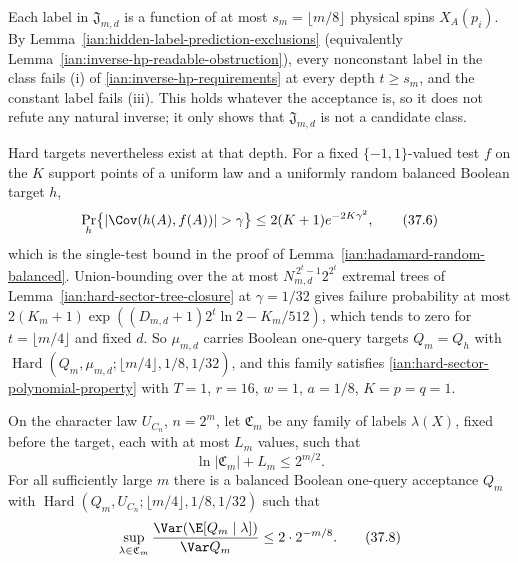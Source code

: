 \begin{remark}
\label{ian:inverse-hp-feature-classes}
Each label in \(\mathfrak J_{m,d}\) is a function of at most \(s_m=\lfloor m/8\rfloor\) physical spins \(X_A(p_i)\). By Lemma~\ref{ian:hidden-label-prediction-exclusions} (equivalently Lemma~\ref{ian:inverse-hp-readable-obstruction}), every nonconstant label in the class fails (i) of \eqref{ian:inverse-hp-requirements} at every depth \(t\ge s_m\), and the constant label fails (iii). This holds whatever the acceptance is, so it does not refute any natural inverse; it only shows that \(\mathfrak J_{m,d}\) is not a candidate class.

Hard targets nevertheless exist at that depth. For a fixed \(\{-1,1\}\)-valued test \(f\) on the \(K\) support points of a uniform law and a uniformly random balanced Boolean target \(h\),
\[
 \Pr_h\bigl\{|\Cov(h(A),f(A))|>\gamma\bigr\}\le2(K+1)e^{-2K\gamma^2},
 \tag{37.6}\label{ian:inverse-hp-single-test-tail}
\]
which is the single-test bound in the proof of Lemma~\ref{ian:hadamard-random-balanced}. Union-bounding over the at most \(N_{m,d}^{\,2^t-1}2^{2^t}\) extremal trees of Lemma~\ref{ian:hard-sector-tree-closure} at \(\gamma=1/32\) gives failure probability at most \(2(K_m+1)\exp((D_{m,d}+1)2^t\ln2-K_m/512)\), which tends to zero for \(t=\lfloor m/4\rfloor\) and fixed \(d\). So \(\mu_{m,d}\) carries Boolean one-query targets \(Q_m=Q_h\) with \(\operatorname{Hard}(Q_m,\mu_{m,d};\lfloor m/4\rfloor,1/8,1/32)\), and this family satisfies \eqref{ian:hard-sector-polynomial-property} with \(T=1\), \(r=16\), \(w=1\), \(a=1/8\), \(K=p=q=1\).
\end{remark}

\begin{proposition}
\label{ian:inverse-hp-family-negative}
On the character law \(U_{C_n}\), \(n=2^m\), let \(\mathfrak C_m\) be any family of labels \(\lambda(X)\), fixed before the target, each with at most \(L_m\) values, such that
\[
 \ln|\mathfrak C_m|+L_m\le2^{m/2}.
 \tag{37.7}\label{ian:inverse-hp-family-size}
\]
For all sufficiently large \(m\) there is a balanced Boolean one-query acceptance \(Q_m\) with \(\operatorname{Hard}(Q_m,U_{C_n};\lfloor m/4\rfloor,1/8,1/32)\) such that
\[
 \sup_{\lambda\in\mathfrak C_m}\frac{\Var(\E[Q_m\mid\lambda])}{\Var Q_m}\le2\cdot2^{-m/8}.
 \tag{37.8}
\]
\end{proposition}

